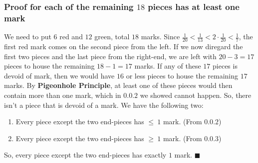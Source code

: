 \documentclass{article}
\begin{document}
\subsubsection{Proof for each of the remaining $18$ pieces has at least one mark}
We need to put $6$ red and $12$ green, total $18$ marks. Since $\frac{1}{20} < \frac{1}{13} < 2 \cdot \frac{1}{20} < \frac{1}{7}$, the first red mark comes on the second piece from the left. If we now diregard the first two pieces and the last piece from the right-end, we are left with $20-3 = 17$ pieces to house the remaining $18-1=17$ marks. If any of these $17$ pieces is devoid of mark, then we would have $16$ or less pieces to house the remaining $17$ marks. By \textbf{Pigeonhole Principle}, at least one of these pieces would then contain more than one mark, which in $0.0.2$ we showed cannot happen. So, there isn't a piece that is devoid of a mark. We have the following two:
\begin{enumerate}
\item Every piece except the two end-pieces has $\leq\ 1$ mark. (From $0.0.2$)
\item Every piece except the two end-pieces has $\geq\ 1$ mark. (From $0.0.3$)
\end{enumerate}
So, every piece except the two end-pieces has exactly $1$ mark.  $\blacksquare$
\end{document}
